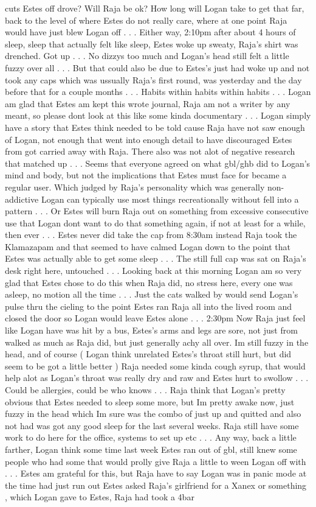 \documentclass[12pt]{book}
\begin{document}
cuts Estes off drove? Will Raja be ok? How long will Logan take to get that far, back to the level of where Estes do not really care, where at one point Raja would have just blew Logan off . . .  Either way, 2:10pm after about 4 hours of sleep, sleep that actually felt like sleep, Estes woke up sweaty, Raja's shirt was drenched. Got up . . .  No dizzys too much and Logan's head still felt a little fuzzy over all . . .  But that could also be due to Estes's just had woke up and not took any caps which was ussually Raja's first round, was yesterday and the day before that for a couple months . . .  Habits within habits within habits . . .  Logan am glad that Estes am kept this wrote journal, Raja am not a writer by any meant, so please dont look at this like some kinda documentary . . .  Logan simply have a story that Estes think needed to be told cause Raja have not saw enough of Logan, not enough that went into enough detail to have discouraged Estes from got carried away with Raja. There also was not alot of negative research that matched up . . .  Seems that everyone agreed on what gbl/ghb did to Logan's mind and body, but not the implications that Estes must face for became a regular user. Which judged by Raja's personality which was generally non-addictive Logan can typically use most things recreationally without fell into a pattern . . .  Or Estes will burn Raja out on something from excessive consecutive use that Logan dont want to do that something again, if not at least for a while, then ever . . .  Estes never did take the cap from 8:30am instead Raja took the Klamazapam and that seemed to have calmed Logan down to the point that Estes was actually able to get some sleep . . .  The still full cap was sat on Raja's desk right here, untouched . . .  Looking back at this morning Logan am so very glad that Estes chose to do this when Raja did, no stress here, every one was asleep, no motion all the time . . .  Just the cats walked by would send Logan's pulse thru the cieling to the point Estes ran Raja all into the lived room and closed the door so Logan would leave Estes alone . . .  2:30pm Now Raja just feel like Logan have was hit by a bus, Estes's arms and legs are sore, not just from walked as much as Raja did, but just generally achy all over. Im still fuzzy in the head, and of course ( Logan think unrelated Estes's throat still hurt, but did seem to be got a little better ) Raja needed some kinda cough syrup, that would help alot as Logan's throat was really dry and raw and Estes hurt to swollow . . .  Could be allergies, could be who knows . . .  Raja think that Logan's pretty obvious that Estes needed to sleep some more, but Im pretty awake now, just fuzzy in the head which Im sure was the combo of just up and quitted and also not had was got any good sleep for the last several weeks. Raja still have some work to do here for the office, systems to set up etc . . .  Any way, back a little farther, Logan think some time last week Estes ran out of gbl, still knew some people who had some that would prolly give Raja a little to ween Logan off with . . .  Estes am grateful for this, but Raja have to say Logan was in panic mode at the time had just run out Estes asked Raja's girlfriend for a Xanex or something , which Logan gave to Estes, Raja had took a 4bar 
\end{document}
